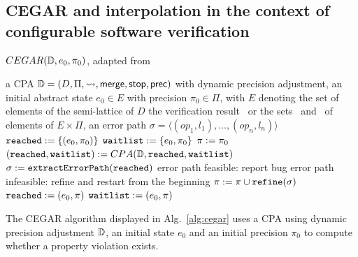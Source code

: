 \subsection{CEGAR and interpolation in the context of configurable software verification}
\label{sec:cegarBasics}

\begin{algorithm}[t]
\caption{$CEGAR(\mathbb{D}, e_0, \pi_0)$, adapted from \cite{Beyer2013}}
\label{alg:cegar}
\begin{algorithmic}[1]
\Input a CPA $\mathbb{D} = (D, \Pi, \rightsquigarrow, \operatorname{\operatorname{\mathsf{merge}}}, \operatorname{\operatorname{\mathsf{stop}}}, \operatorname{\operatorname{\mathsf{prec}}})$ with dynamic precision adjustment,
	an initial abstract state $e_0 \in E$ with precision $\pi_0 \in \Pi$,
	with $E$ denoting the set of elements of the semi-lattice of $D$
\Output the verification result \safe\ or \unsafe
\Variables the sets \reachedSet\ and \waitlistSet\ of elements of $E \times \Pi$,
	      an error path $\sigma = \langle (op_1, l_1), ..., (op_n, l_n) \rangle$\\

\State $\texttt{reached} := \{ (e_0, \pi_0) \}$
\State $\texttt{waitlist} := \{ e_0, \pi_0 \}$
\State $\pi := \pi_0$
	\State $(\texttt{reached}, \texttt{waitlist}) := CPA(\mathbb{D}, \texttt{reached}, \texttt{waitlist})$
	\If{$\waitlistSet = \varnothing$}
		\Return \safe
	\Else
		\State $\sigma := \texttt{extractErrorPath}(\texttt{reached})$ \label{alg:cegar:extraction}
		\If{\isFeasible{$\sigma$}} \Comment error path feasible: report bug \label{alg:cegar:feasibilityCheck}
			\State %
			\Return \unsafe 
		\Else \Comment error path infeasible: refine and restart from the beginning
			\State $\pi := \pi \cup \texttt{refine}(\sigma)$
			\State $\texttt{reached} := (e_0, \pi)$
			\State $\texttt{waitlist} := (e_0, \pi)$ \label{alg:cegar:end}
		\EndIf
	\EndIf
\EndWhile
\end{algorithmic}
\end{algorithm}

The CEGAR algorithm displayed in Alg.~\ref{alg:cegar} uses a CPA using dynamic precision adjustment $\mathbb{D}$,
an initial state $e_0$
and an initial precision $\pi_0$
to compute whether a property violation exists.

